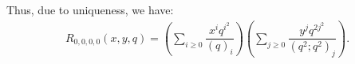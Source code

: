 Thus, due to uniqueness, we have:
\begin{align}
R_{0,0,0,0}(x,y,q)=\left(\sum_{i\geq 0} \dfrac{x^iq^{i^2}}{(q)_i}\right)
\left(\sum_{j\geq 0} \dfrac{y^jq^{2j^2}}{(q^2;q^2)_j}\right).
\end{align}
